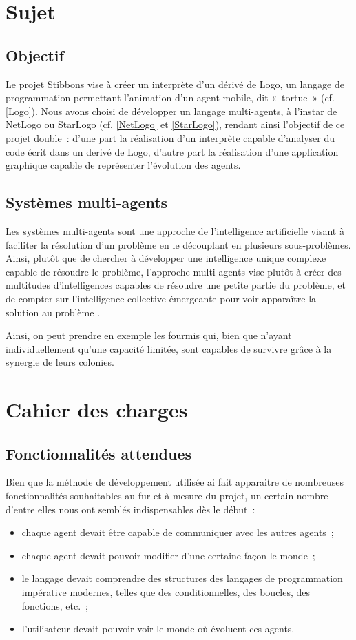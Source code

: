 \section{Sujet}
	\subsection{Objectif}
	Le projet Stibbons vise à créer un interprète d'un dérivé de Logo, un langage de programmation permettant l'animation d'un agent mobile, dit «~tortue~» (cf. \ref{Logo}). Nous avons choisi de développer un langage multi-agents, à l'instar de NetLogo ou StarLogo (cf. \ref{NetLogo} et \ref{StarLogo}), rendant ainsi l'objectif de ce projet double~: d'une part la réalisation d'un interprète capable d'analyser du code écrit dans un derivé de Logo, d'autre part la réalisation d'une application graphique capable de représenter l'évolution des agents.

	\subsection{Systèmes multi-agents}
	Les systèmes multi-agents sont une approche de l'intelligence artificielle visant à faciliter la résolution d'un problème en le découplant en plusieurs sous-problèmes. Ainsi, plutôt que de chercher à développer une intelligence unique complexe capable de résoudre le problème, l'approche multi-agents vise plutôt à créer des multitudes d'intelligences capables de résoudre une petite partie du problème, et de compter sur l'intelligence collective émergeante pour voir apparaître la solution au problème \cite{sma}.

	Ainsi, on peut prendre en exemple les fourmis qui, bien que n'ayant individuellement qu'une capacité limitée, sont capables de survivre grâce à la synergie de leurs colonies.

\section{Cahier des charges}
	\subsection{Fonctionnalités attendues}
	Bien que la méthode de développement utilisée ai fait apparaitre de nombreuses fonctionnalités souhaitables au fur et à mesure du projet, un certain nombre d'entre elles nous ont semblés indispensables dès le début~:
	\begin{itemize}
		\item chaque agent devait être capable de communiquer avec les autres agents~;
		\item chaque agent devait pouvoir modifier d'une certaine façon le monde~;
		\item le langage devait comprendre des structures des langages de programmation impérative modernes, telles que des conditionnelles, des boucles, des fonctions, etc.~;
		\item l'utilisateur devait pouvoir voir le monde où évoluent ces agents.
	\end{itemize}

